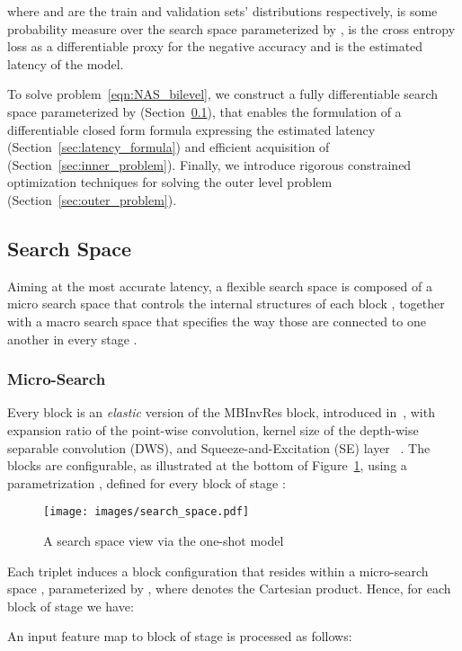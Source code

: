 \documentclass[dvipsnames,table,xcdraw]{article}
\begin{document}
where  and  are the train and validation sets' distributions respectively,  is some probability measure over the search space parameterized by ,  is the cross entropy loss as a differentiable proxy for the negative accuracy and  is the estimated latency of the model.

To solve problem~\eqref{eqn:NAS_bilevel}, we construct a fully differentiable search space parameterized by  (Section~\ref{sec:search_space}), that enables the formulation of a differentiable closed form formula expressing the estimated latency  (Section~\ref{sec:latency_formula}) and efficient acquisition of  (Section~\ref{sec:inner_problem}). Finally, we introduce rigorous constrained optimization techniques for solving the outer level problem (Section~\ref{sec:outer_problem}).

\subsection{Search Space}
\label{sec:search_space}
Aiming at the most accurate latency, a flexible search space is composed of a micro search space that controls the internal structures of each block , together with a macro search space that specifies the way those are connected to one another in every stage .

\subsubsection{Micro-Search}\label{sec:micro_search}
Every block is an \textit{elastic} version of the MBInvRes block, introduced in~\cite{mobilenetv2}, with expansion ratio  of the point-wise convolution, kernel size  of the depth-wise separable convolution (DWS), and Squeeze-and-Excitation (SE) layer~\cite{SE} .
The blocks are configurable, as illustrated at the bottom of Figure~\ref{fig:super_net}, using a parametrization , defined for every block  of stage :

\begin{figure}[t]
  \centering
  \texttt{[image: images/search\_space.pdf]}
\caption{A search space view via the one-shot model}
\label{fig:super_net}
\end{figure}
Each triplet  induces a block configuration  that resides within a micro-search space , parameterized by  , where  denotes the Cartesian product. Hence, for each block  of stage  we have:

An input feature map  to block  of stage  is processed as follows:
\end{document}
